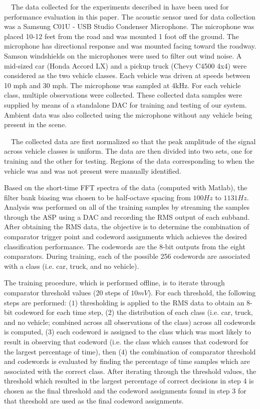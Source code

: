 ~~The data collected for the experiments described in \cite{lanl} have been used for performance evaluation in this paper. The acoustic sensor used for data collection was a Samsung C01U - USB Studio Condenser Microphone. The microphone was placed 10-12 feet from the road and was mounted 1 foot off the ground.  The microphone has directional response and was mounted facing toward the roadway. Samson windshields on the microphones were used to filter out wind noise. A mid-sized car (Honda Accord LX) and a pickup truck (Chevy C4500 4x4) were considered as the two vehicle classes. Each vehicle was driven at speeds between 10 mph and 30 mph. The microphone was sampled at 4kHz. For each vehicle class, multiple observations were collected. These collected data samples were supplied by means of a standalone DAC for training and testing of our system. Ambient data was also collected using the microphone without any vehicle being present in the scene. 



~~The collected data are first normalized so that the peak amplitude of the signal across vehicle classes is uniform.  The data are then divided into two sets, one for training and the other for testing. Regions of the data corresponding to when the vehicle was and was not present were manually identified. 

Based on the short-time FFT spectra of the data (computed with Matlab), the filter bank biasing was chosen to be half-octave spacing from $100Hz$ to $1131Hz$.  Analysis was performed on all of the training samples by streaming the samples through the ASP using a DAC and recording the RMS output of each subband.  After obtaining the RMS data, the objective is to determine the combination of comparator trigger point and codeword assignments which achieves the desired classification performance.  The codewords are the 8-bit outputs from the eight comparators.  During training, each of the possible 256 codewords are associated with a class (i.e. car, truck, and no vehicle).  

The training procedure, which is performed offline, is to iterate through comparator threshold values (20 steps of $10mV$).  For each threshold, the following steps are performed: ($1$) thresholding is applied to the RMS data to obtain an 8-bit codeword for each time step, ($2$) the distribution of each class (i.e. car, truck, and no vehicle; combined across all observations of the class) across all codewords is computed, ($3$) each codeword is assigned to the class which was most likely to result in observing that codeword (i.e. the class which causes that codeword for the largest percentage of time), then ($4$) the combination of comparator threshold and codewords is evaluated by finding the percentage of time samples which are associated with the correct class.  After iterating through the threshold values, the threshold which resulted in the largest percentage of correct decisions in step 4 is chosen as the final threshold and the codeword assignments found in step 3 for that threshold are used as the final codeword assignments.

